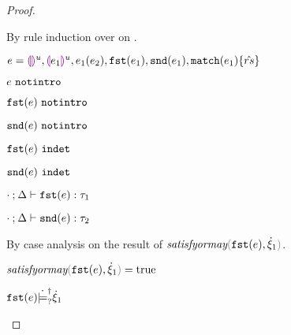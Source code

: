 \begin{proof}
\begin{byCases}
\begin{byCases}
    \item[\text{(\ref{rule:FIndet})}]
      \begin{pfsteps}
      \item {}  
      \end{pfsteps}
      By rule induction over  on .
      \begin{byCases}
        \item[\text{(\ref{rule:IEHole}), (\ref{rule:IHole}), (\ref{rule:IAp}), (\ref{rule:IFst}), (\ref{rule:ISnd}), (\ref{rule:IMatch})}]
        \begin{pfsteps*}
        \item $e=\textcolor{violet}{\llparenthesis}\textcolor{violet}{\rrparenthesis}^{u}, \textcolor{violet}{\llparenthesis} e_1\textcolor{violet}{\rrparenthesis}^{u}, e_1(e_2), \mathtt{fst}(e_1), \mathtt{snd}(e_1), \mathtt{match}(e_1) \{\hat{rs}\}$ 
        \item $e ~\mathtt{notintro}$  
        \item $\mathtt{fst}(e) ~\mathtt{notintro}$  
        \item $\mathtt{snd}(e) ~\mathtt{notintro}$  
        \item $\mathtt{fst}(e) ~\mathtt{indet}$  
        \item $\mathtt{snd}(e) ~\mathtt{indet}$  
        \item $\cdot \mathbin{;} \Delta \vdash \mathtt{fst}(e) : \tau_1$  
        \item $\cdot \mathbin{;} \Delta \vdash \mathtt{snd}(e) : \tau_2$  
        \end{pfsteps*}
        By case analysis on the result of $\fsatisfyormay{\hfst{e}}{\hxi_1}$.
        \begin{byCases}
          \item[\true]
          \begin{pfsteps*}
          \item $\fsatisfyormay{\hfst{e}}{\hxi_1}=\true$  
          \item $\mathtt{fst}(e) \dot{\models}_{?}^{\dag} \dot{\xi}_1$  
          \end{pfsteps*} 

\end{byCases}
\end{byCases}
\end{byCases}
\end{byCases}
\end{proof}
